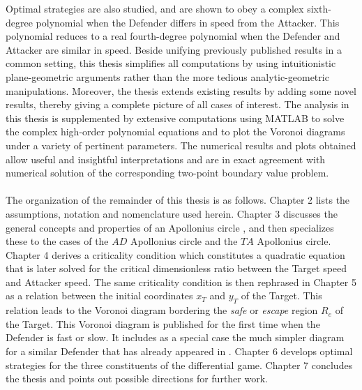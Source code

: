 Optimal strategies are also studied, and are shown to obey a complex sixth-degree polynomial when the Defender differs in speed from the Attacker. This polynomial reduces to a real fourth-degree polynomial when the Defender and Attacker are similar in speed.
Beside unifying previously published results in a common setting, this thesis simplifies all computations by using intuitionistic plane-geometric arguments rather than the more tedious analytic-geometric manipulations. 
Moreover, the thesis extends existing results by adding some novel results, thereby giving a complete picture of all cases of interest.
The analysis in this thesis is supplemented by extensive computations using MATLAB to solve the complex high-order polynomial equations and to plot the Voronoi diagrams under a variety of pertinent parameters. The numerical results and plots obtained allow useful and insightful interpretations and are in exact agreement with numerical solution of the corresponding two-point boundary value problem.
\\
\\
The organization of the remainder of this thesis is as follows. Chapter 2 lists the assumptions, notation and nomenclature used herein. Chapter 3 discusses the general concepts and properties of an Apollonius circle \cite{ayoub2003proving,ayoub2006circle,partensky2008circle,fulton2015conflict}, and then specializes these to the cases of the $AD$ Apollonius circle and the $TA$ Apollonius circle. Chapter 4 derives a criticality condition which constitutes a quadratic equation that is later solved for the critical dimensionless ratio between the Target speed and Attacker speed. The same criticality condition is then rephrased in Chapter 5 as a relation between the initial coordinates $x_T$ and $y_T$ of the Target. This relation leads to the Voronoi diagram bordering the \textit{safe} or \textit{escape} region $R_e$ of the Target. This Voronoi diagram is published for the first time when the Defender is fast or slow. It includes as a special case the much simpler diagram for a similar Defender that has already appeared in \cite{garcia2015escape}. Chapter 6 develops optimal strategies for the three constituents of the differential game. Chapter 7 concludes the thesis and points out possible directions for further work.  
